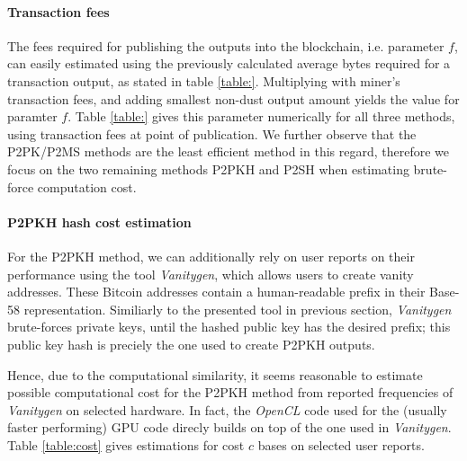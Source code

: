 \documentclass[10pt,a4paper,twocolumn]{article}
\begin{document}
\paragraph{Transaction fees}
The fees required for publishing the outputs into the blockchain, i.e. parameter $f$, can easily estimated using the previously calculated average bytes required for a transaction output, as stated in table \ref{table:}.
Multiplying with miner's transaction fees, and adding smallest non-dust output amount yields the value for paramter $f$.
Table \ref{table:} gives this parameter numerically for all three methods, using transaction fees at point of publication.
We further observe that the P2PK/P2MS methods are the least efficient method in this regard, therefore we focus on the two remaining methods P2PKH and P2SH when estimating brute-force computation cost.

\paragraph{P2PKH hash cost estimation}
For the {P2PKH} method, we can additionally rely on user reports on their performance using the tool \emph{Vanitygen}, which allows users to create vanity addresses.
These Bitcoin addresses contain a human-readable prefix in their Base-58 representation.
Similiarly to the presented tool in previous section, \emph{Vanitygen} brute-forces private keys, until the hashed public key has the desired prefix;
this public key hash is preciely the one used to create {P2PKH} outputs.

Hence, due to the computational similarity, it seems reasonable to estimate possible computational cost for the {P2PKH} method from reported frequencies of \emph{Vanitygen} on selected hardware.
In fact, the \emph{OpenCL} code used for the (usually faster performing) GPU code direcly builds on top of the one used in \emph{Vanitygen}.
Table \ref{table:cost} gives estimations for cost $c$ bases on selected user reports.
\end{document}
